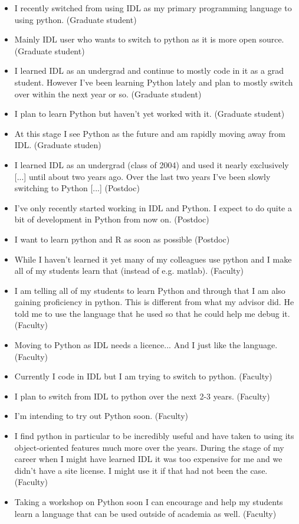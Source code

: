 \begin{itemize}
\item{I recently switched from using IDL as my primary programming language to using python. (Graduate student)}
\item{Mainly IDL user who wants to switch to python as it is more open source. (Graduate student)}
\item{I learned IDL as an undergrad and continue to mostly code in it as a grad student. However I've been learning Python lately and plan to mostly switch over within the next year or so. (Graduate student)}
\item{I plan to learn Python but haven't yet worked with it. (Graduate student)}
\item{At this stage I see Python as the future and am rapidly moving away from IDL. (Graduate studen)}
\item{I learned IDL as an undergrad (class of 2004) and used it nearly exclusively [...] until about two years ago. Over the last two years I've been slowly switching to Python [...]
(Postdoc)}
\item{I've only recently started working in IDL and Python.  I expect to do quite a bit of development in Python from now on. (Postdoc)}
\item{I want to learn python and R as soon as possible (Postdoc)}
\item{While I haven't learned it yet many of my colleagues use python and I make all of my students learn that (instead of e.g. matlab). (Faculty)}
\item{I am telling all of my students to learn Python and through that I am also gaining proficiency in python.  This is different from what my advisor did.  He told me to use the language that he used so that he could help me debug it. (Faculty)}
\item{Moving to Python as IDL needs a licence... And I just like the language. (Faculty)}
\item{Currently I code in IDL but I am trying to switch to python. (Faculty)}
\item{I plan to switch from IDL to python over the next 2-3 years. (Faculty)}
\item{I'm intending to try out Python soon. (Faculty)}
\item{I find python in particular to be incredibly useful and have taken to using its object-oriented features much more over the years.  During the stage of my career when I might have learned IDL it was too expensive for me and we didn't have a site license.  I might use it if that had not been the case. (Faculty)}
\item{Taking a workshop on Python soon I can encourage and help my students learn a language that can be used outside of academia as well. (Faculty)}
\end{itemize}

